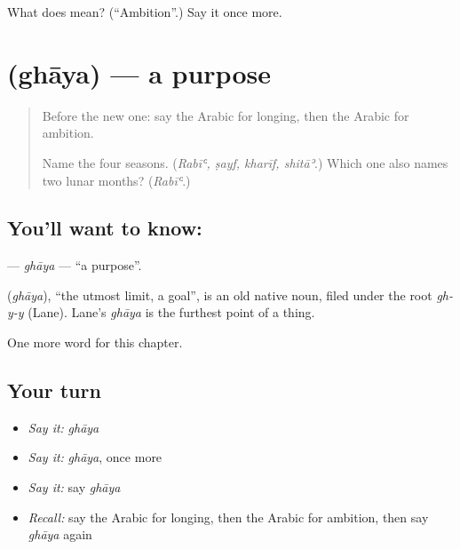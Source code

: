 \begin{tcolorbox}[breakable,colback=teal!4,colframe=teal!35!black,title={Before you move on}]
What does  mean? (\textquotedblleft{}Ambition\textquotedblright{}.) Say it once more.
\end{tcolorbox}
\section[\texorpdfstring{\ar{غاية} (ghāya)}{غاية (ghāya)}]{ (ghāya) — a purpose}

\label{lesson:AR-C112-ghaya}



\begin{quote}
Before the new one: say the Arabic for longing, then the Arabic for ambition.

Name the four seasons. (\emph{Rabīʿ, ṣayf, kharīf, shitāʾ}.) Which one also names two lunar months? (\emph{Rabīʿ}.)
\end{quote}

\subsection*{You'll want to know: }
\textbf{} — \emph{ghāya} — \textquotedblleft{}a purpose\textquotedblright{}.

\begin{cousinweb}
\textbf{} (\emph{ghāya}), \textquotedblleft{}the utmost limit, a goal\textquotedblright{}, is an old native noun, filed under the root \emph{gh-y-y} (Lane). Lane's \emph{ghāya} is the furthest point of a thing.
\end{cousinweb}

\begin{grammarlens}[title={What you've built}]
One more word for this chapter.
\end{grammarlens}

\subsection*{Your turn}
\begin{itemize}
\raggedright
  \item \emph{Say it:} \emph{ghāya}
  \item \emph{Say it:} \emph{ghāya}, once more
  \item \emph{Say it:} say \emph{ghāya}
  \item \emph{Recall:} say the Arabic for longing, then the Arabic for ambition, then say \emph{ghāya} again
\end{itemize}

